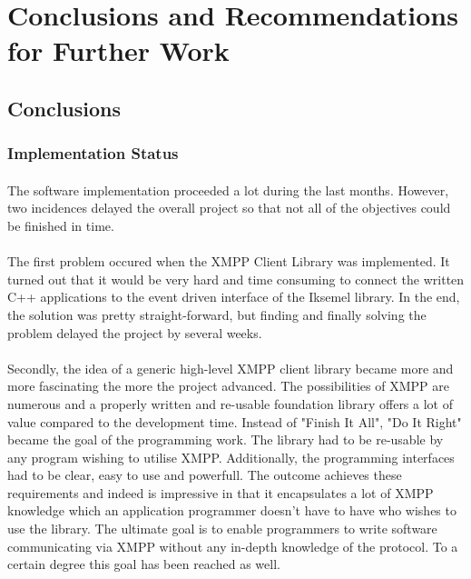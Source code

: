 \section{Conclusions and Recommendations for Further Work}

\subsection{Conclusions}

\subsubsection{Implementation Status}
\paragraph{}
The software implementation proceeded a lot during the last months. However, two incidences delayed the overall project so that not all of the objectives could be finished in time.

\paragraph{}
The first problem occured when the XMPP Client Library was implemented. It turned out that it would be very hard and time consuming to connect the written C++ applications to the event driven interface of the Iksemel library. In the end, the solution was pretty straight-forward, but finding and finally solving the problem delayed the project by several weeks.

\paragraph{}
Secondly, the idea of a generic high-level XMPP client library became more and more fascinating the more the project advanced. The possibilities of XMPP are numerous and a properly written and re-usable foundation library offers a lot of value compared to the development time. Instead of "Finish It All", "Do It Right" became the goal of the programming work. The library had to be re-usable by any program wishing to utilise XMPP. Additionally, the programming interfaces had to be clear, easy to use and powerfull. The outcome achieves these requirements and indeed is impressive in that it encapsulates a lot of XMPP knowledge which an application programmer doesn't have to have who wishes to use the library. The ultimate goal is to enable programmers to write software communicating via XMPP without any in-depth knowledge of the protocol. To a certain degree this goal has been reached as well.

